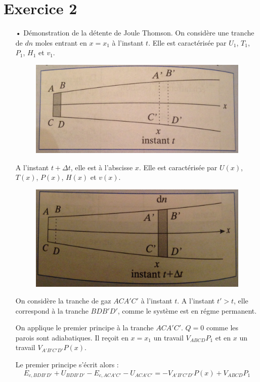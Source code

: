 \documentclass{report}
\begin{document}
\newpage

\section*{Exercice 2}

\begin{itemize}

	\item[•] Démonstration de la détente de Joule Thomson. On considère une tranche de $dn$ moles entrant en $x=x_1$ à l'instant $t$. Elle est caractérisée par $U_1$, $T_1$, $P_1$, $H_1$ et $v_1$. 
	
\begin{figure}[!h]

\centering
\includegraphics[width=0.4\linewidth]{tuyere1.png}

\end{figure}	

A l'instant $t+\Delta t$, elle est à l'abscisse $x$. Elle est caractérisée par $U(x)$, $T(x)$, $P(x)$, $H(x)$ et $v(x)$. 
	
\begin{figure}[!h]
\centering
\includegraphics[width=0.4\linewidth]{tuyere2.png}
\end{figure}	

On considère la tranche de gaz $ACA'C'$ à l'instant $t$. A l'instant $t'>t$, elle correspond à la tranche $BDB'D'$, comme le système est en régme permanent. 

On applique le premier principe à la tranche $ACA'C'$. $Q=0$ comme les parois sont adiabatiques. 
Il reçoit en $x=x_1$ un travail $V_{ABCD}P_1$ et en $x$ un travail $V_{A'B'C'D'}P(x)$.

Le premier principe s'écrit alors :
\begin{equation}
	E_{c,BDB'D'} + U_{BDB'D'} - E_{c,ACA'C'} - U_{ACA'C'} = -V_{A'B'C'D'}P(x)+V_{ABCD}P_1
\end{equation}


\end{itemize}
\end{document}
